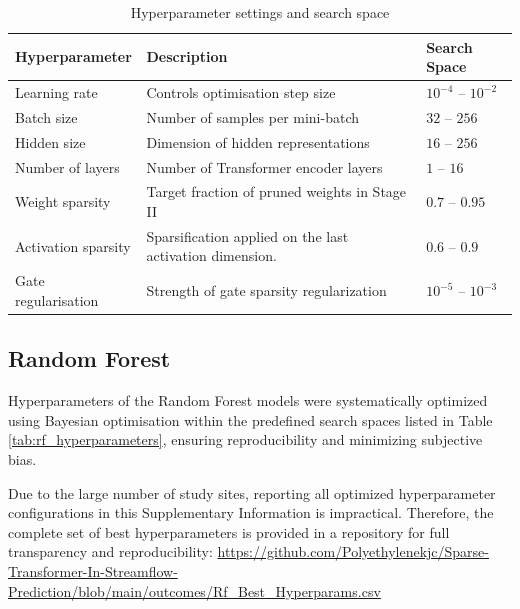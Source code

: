 \documentclass[11pt]{article}
\begin{document}
\begin{table}[htbp]
    \centering
    \caption{Hyperparameter settings and search space}
    \label{tab:hyperparameters}
    \begin{tabular*}{\textwidth}{@{\extracolsep{\fill}}lll}
        \toprule
        \textbf{Hyperparameter} & \textbf{Description} & \textbf{Search Space} \\
        \midrule
        Learning rate & Controls optimisation step size & $10^{-4}$ -- $10^{-2}$ \\
        Batch size & Number of samples per mini-batch & $32$ -- $256$ \\
        Hidden size & Dimension of hidden representations & $16$ -- $256$ \\
        Number of layers & Number of Transformer encoder layers & $1$ -- $16$ \\
        Weight sparsity & Target fraction of pruned weights in Stage II & $0.7$ -- $0.95$ \\
        Activation sparsity & Sparsification applied on the last activation dimension. & $0.6$ -- $0.9$ \\
        Gate regularisation & Strength of gate sparsity regularization & $10^{-5}$ -- $10^{-3}$ \\
        \bottomrule
    \end{tabular*}
\end{table}

\subsection{Random Forest}
\label{sec:rfHyper}
Hyperparameters of the Random Forest models were systematically optimized using Bayesian optimisation within the predefined search spaces listed in Table \ref{tab:rf_hyperparameters}\cite{BO_OPT}, ensuring reproducibility and minimizing subjective bias.

Due to the large number of study sites, reporting all optimized hyperparameter configurations in this Supplementary Information is impractical. Therefore, the complete set of best hyperparameters is provided in a repository for full transparency and reproducibility: \href{https://github.com/Polyethylenekjc/Sparse-Transformer-In-Streamflow-Prediction/blob/main/outcomes/Rf\_Best\_Hyperparams.csv}{https://github.com/Polyethylenekjc/Sparse-Transformer-In-Streamflow-Prediction/blob/main/outcomes/Rf\_Best\_Hyperparams.csv}
\end{document}
